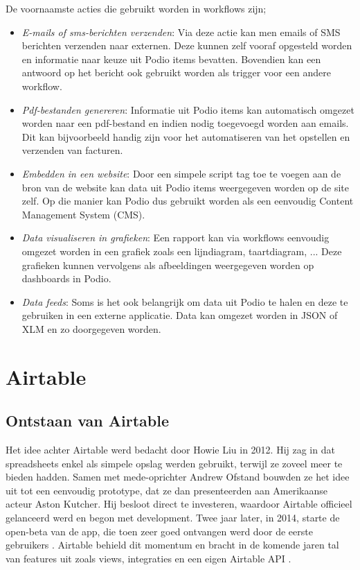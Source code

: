 De voornaamste acties die gebruikt worden in workflows zijn;
\begin{itemize}
    \item \textit{E-mails of sms-berichten verzenden}: Via deze actie kan men emails of SMS berichten verzenden naar externen. Deze kunnen zelf vooraf opgesteld worden en informatie naar keuze uit Podio items bevatten. Bovendien kan een antwoord op het bericht ook gebruikt worden als trigger voor een andere workflow. \autocite{PodioWorkflowFeatures}
    \item \textit{Pdf-bestanden genereren}: Informatie uit Podio items kan automatisch omgezet worden naar een pdf-bestand en indien nodig toegevoegd worden aan emails. Dit kan bijvoorbeeld handig zijn voor het automatiseren van het opstellen en verzenden van facturen. \autocite{PodioWorkflowFeatures}
    \item \textit{Embedden in een website}: Door een simpele script tag toe te voegen aan de bron van de website kan data uit Podio items weergegeven worden op de site zelf. Op die manier kan Podio dus gebruikt worden als een eenvoudig Content Management System (CMS). \autocite{PodioWorkflowFeatures}
    \item \textit{Data visualiseren in grafieken}: Een rapport kan via workflows eenvoudig omgezet worden in een grafiek zoals een lijndiagram, taartdiagram, ... Deze grafieken kunnen vervolgens als afbeeldingen weergegeven worden op dashboards in Podio. \autocite{PodioWorkflowFeatures}
    \item \textit{Data feeds}: Soms is het ook belangrijk om data uit Podio te halen en deze te gebruiken in een externe applicatie. Data kan omgezet worden in JSON of XLM en zo doorgegeven worden. \autocite{PodioWorkflowFeatures}
\end{itemize}

\section{Airtable}
\label{sec:airtable}


\subsection{Ontstaan van Airtable}
\label{subsec:ontstaan_airtable}


Het idee achter Airtable werd bedacht door Howie Liu in 2012. Hij zag in dat spreadsheets enkel als simpele opslag werden gebruikt, terwijl ze zoveel meer te bieden hadden. Samen met mede-oprichter Andrew Ofstand bouwden ze het idee uit tot een eenvoudig prototype, dat ze dan presenteerden aan Amerikaanse acteur Aston Kutcher. Hij besloot direct te investeren, waardoor Airtable officieel gelanceerd werd en begon met development. Twee jaar later, in 2014, starte de open-beta van de app, die toen zeer goed ontvangen werd door de eerste gebruikers \autocite{Black2019}. Airtable behield dit momentum en bracht in de komende jaren tal van features uit zoals views, integraties en een eigen Airtable API \autocite{Shah}. \\


